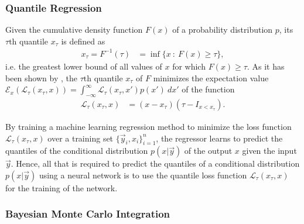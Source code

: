 \documentclass[journal abbreviation, manuscript]{copernicus}
\begin{document}
\subsubsection{Quantile Regression}

    Given the cumulative density function $F(x)$ of a probability distribution
    $p$, its $\tau\text{th}$ quantile $x_\tau$ is defined as
    \begin{align}
    x_\tau = F^{-1}(\tau) &= \inf \{x \: : \: F(x) \geq \tau \},
    \end{align}
    i.e. the greatest lower bound of all values of $x$ for which $F(x) \geq \tau$.
    As it has been shown by \citep{koenker}, the $\tau\text{th}$ quantile $x_\tau$ of $F$
    minimizes the expectation value $\mathcal{E}_x\left ( \mathcal{L}_\tau(x_\tau, x) \right) = \int_{-\infty}^\infty \mathcal{L}_\tau(x_\tau, x') p(x') \: dx'$
    of the function
    \begin{align}\label{eq:quantile_loss}
      \mathcal{L}_{\tau}(x_\tau, x) &=  (x - x_\tau)(\tau - I_{x < x_\tau}).
    \end{align}

    By training a machine learning regression method to minimize the
    loss function $\mathcal{L}_\tau(x_\tau, x)$ over a training set
    $\{\vec{y}_i, x_i\}_{i = 1}^n$, the regressor learns to predict
    the quantiles of the conditional distribution $p(x | \vec{y})$
    of the output $x$ given the input $\vec{y}$. Hence, all that is required
    to predict the quantiles of a conditional distribution $p(x | \vec{y})$
    using a neural network is to use the quantile loss function
    $\mathcal{L}_\tau(x_\tau, x)$ for the training of the network.
    
    

\subsubsection{Bayesian Monte Carlo Integration}
\end{document}
